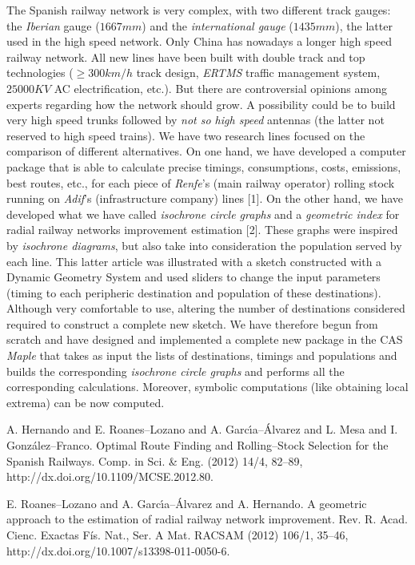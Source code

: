 \documentclass[article, A4, 11pt]{llncs}%
\begin{document}
The Spanish railway network is very complex, with two different track gauges: the \textit{Iberian} gauge ($1667 mm$) and the \textit{international gauge} ($1435 mm$), the latter used in the high speed network. Only China has nowadays a longer high speed railway network. All new lines have been built with double track and top technologies
($\geq 300 km/h$ track design, \textit{ERTMS} traffic management system, $25000 KV$ AC electrification, etc.). But there are controversial opinions among experts regarding how the network should grow. A possibility could be to build very high speed trunks followed by \textit{not so high speed} antennas (the latter not reserved to high speed trains). We have two research lines focused on the comparison of different alternatives. On one hand, we have developed a computer package that is able to calculate precise timings, consumptions, costs, emissions, best routes, etc., for each piece of \textit{Renfe}'s (main railway operator) rolling stock running on \textit{Adif}'s (infrastructure company) lines [1]. On the other hand, we have developed what we have called \textit{isochrone circle graphs} and a \textit{geometric index} for radial railway networks improvement estimation [2]. These graphs were inspired by \textit{isochrone diagrams}, but also take into consideration the population served by each line. This latter article was illustrated with a sketch constructed with a Dynamic Geometry System and used sliders to change the input parameters (timing to each peripheric destination and population of these destinations). Although very comfortable to use, altering the number of destinations considered required to construct a complete new sketch. We have therefore begun from scratch and have designed and implemented a complete new package in the CAS \textit{Maple} that takes as input the lists of destinations, timings and populations and builds the corresponding \textit{isochrone circle graphs} and performs all the corresponding calculations. Moreover, symbolic computations (like obtaining local extrema) can be now computed.



\begin{thebibliography}{10}
{\sc A. Hernando and E. Roanes--Lozano and A. Garc\'{\i}a--\'Alvarez and L. Mesa and I. Gonz\'alez--Franco}. {Optimal Route Finding and Rolling--Stock Selection for the Spanish Railways}. Comp. in Sci. \& Eng. (2012) 14/4, 82--89,  http://dx.doi.org/10.1109/MCSE.2012.80.

{\sc E. Roanes--Lozano and A. Garc\'{\i}a--\'Alvarez and A. Hernando}. {A geometric approach to the estimation of radial railway network improvement}. Rev. R. Acad. Cienc. Exactas F\'is. Nat., Ser. A Mat. RACSAM (2012) 106/1, 35--46, http://dx.doi.org/10.1007/s13398-011-0050-6.
\end{thebibliography} %
\end{document}
